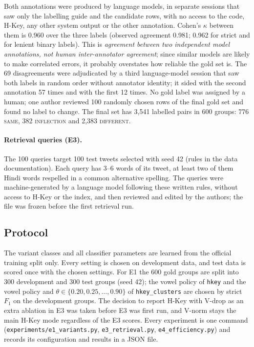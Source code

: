 Both annotations were produced by language models, in separate sessions that saw only the labelling
guide and the candidate rows, with no access to the code, H-Key, any other system output or the
other annotation. Cohen's $\kappa$ between them is 0.960 over the three labels (observed agreement
0.981; 0.962 for strict and for lenient binary labels). This is \emph{agreement between two
independent model annotations, not human inter-annotator agreement}; since similar models are likely
to make correlated errors, it probably overstates how reliable the gold set is. The 69 disagreements
were adjudicated by a third language-model session that saw both labels in random order without
annotator identity; it sided with the second annotation 57 times and with the first 12 times. No
gold label was assigned by a human; one author reviewed 100 randomly chosen rows of the final gold
set and found no label to change. The final set has 3{,}541 labelled pairs in 600 groups:
776 \textsc{same}, 382 \textsc{inflection} and 2{,}383 \textsc{different}.

\paragraph{Retrieval queries (E3).} The 100 queries target 100 test tweets selected with seed 42
(rules in the data documentation). Each query has 3--6 words of its tweet, at least two of them Hindi
words respelled in a common alternative spelling. The queries were machine-generated by a language
model following these written rules, without access to H-Key or the index, and then reviewed and
edited by the authors; the file was frozen before the first retrieval run.

\subsection{Protocol}
\label{sec:protocol}

The variant classes and all classifier parameters are learned from the official training split
only. Every setting is chosen on development data, and test data is scored once with the chosen
settings. For E1 the 600 gold groups are split into 300 development and 300 test groups (seed 42);
the vowel policy of \texttt{hkey} and the vowel policy and $\theta\in\{0.20,0.25,\ldots,0.90\}$ of
\texttt{hkey\_clusters} are chosen by strict $F_1$ on the development groups. The decision to
report H-Key with V-drop as an extra ablation in E3 was taken before E3 was first run, and V-norm
stays the main H-Key mode regardless of the E3 scores. Every experiment is one command
(\texttt{experiments/e1\_variants.py}, \texttt{e3\_retrieval.py}, \texttt{e4\_efficiency.py}) and
records its configuration and results in a JSON file.
